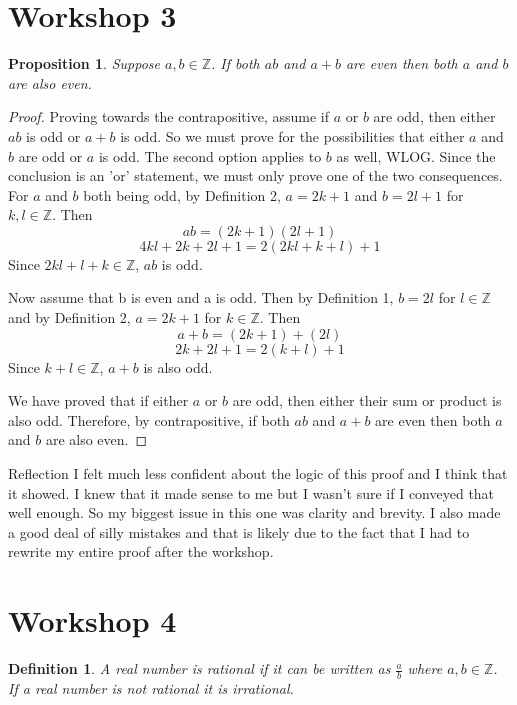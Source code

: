 \documentclass{article}
\newtheorem{prop}{Proposition}
\newtheorem{definition}{Definition}
\begin{document}
\section{Workshop 3}

\begin{prop}
Suppose $a,b \in \mathbb{Z}$. If both $ab$ and $a+b$ are even then both $a$ and $b$ are also even. 
\end{prop}

\begin{proof}
Proving towards the contrapositive, assume if $a$ or $b$ are odd, then either $ab$ is odd or $a+b$ is odd. So we must prove for the possibilities that either $a$ and $b$ are odd or $a$ is odd. The second option applies to $b$ as well, WLOG. Since the conclusion is an 'or' statement, we must only prove one of the two consequences. For $a$ and $b$ both being odd, by Definition 2, $a=2k+1$ and $b=2l+1$ for $k,l \in \mathbb{Z}$. Then $$ab=(2k+1)(2l+1)$$ $$4kl+2k+2l+1=2(2kl+k+l)+1$$Since $2kl+l+k\in\mathbb{Z}$, $ab$ is odd.

\vspace{5mm}

Now assume that b is even and a is odd. Then by Definition 1, $b=2l$ for $l \in \mathbb{Z}$ and by Definition 2, $a=2k+1$ for $k \in \mathbb{Z}$. Then $$a+b=(2k+1)+(2l)$$ $$2k+2l+1=2(k+l)+1$$Since $k+l\in\mathbb{Z}$, $a+b$ is also odd.

\vspace{5mm}

We have proved that if either $a$ or $b$ are odd, then either their sum or product is also odd. Therefore, by contrapositive, if both $ab$ and $a+b$ are even then both $a$ and $b$ are also even. 
\end{proof}

\begin{subsection}{Reflection}
I felt much less confident about the logic of this proof and I think that it showed. I knew that it made sense to me but I wasn't sure if I conveyed that well enough. So my biggest issue in this one was clarity and brevity. I also made a good deal of silly mistakes and that is likely due to the fact that I had to rewrite my entire proof after the workshop.
\end{subsection}



\section{Workshop 4}
\begin{definition}
A real number is rational if it can be written as $\frac{a}{b}$ where $a,b \in \mathbb{Z}$. If a real number is not rational it is irrational.
\end{definition}
\end{document}
